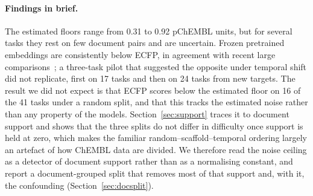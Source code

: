\paragraph{Findings in brief.} The estimated floors range from 0.31 to 0.92 pChEMBL units, but for several tasks they rest on few document pairs and are uncertain. Frozen pretrained embeddings are consistently below ECFP, in agreement with recent large comparisons~\cite{praski2025benchmarking}; a three-task pilot that suggested the opposite under temporal shift did not replicate, first on 17 tasks and then on 24 tasks from new targets. The result we did not expect is that ECFP scores below the estimated floor on 16 of the 41 tasks under a random split, and that this tracks the estimated noise rather than any property of the models. Section~\ref{sec:support} traces it to document support and shows that the three splits do not differ in difficulty once support is held at zero, which makes the familiar random--scaffold--temporal ordering largely an artefact of how ChEMBL data are divided. We therefore read the noise ceiling as a detector of document support rather than as a normalising constant, and report a document-grouped split that removes most of that support and, with it, the confounding (Section~\ref{sec:docsplit}).
